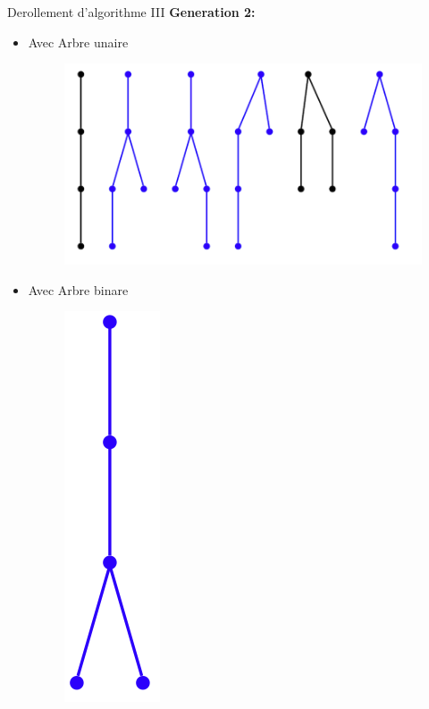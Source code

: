 \documentclass{beamer}
\begin{document}
\begin{frame}{Derollement d'algorithme III}
\textbf{Generation 2:}\\
\begin{itemize}
\item  Avec Arbre unaire
\begin{figure}[h]
  \centering
  \includegraphics[scale=0.17]{gen2-1.png}
\end{figure}
\item Avec Arbre binare
\begin{figure}[h]
  \centering
  \includegraphics[scale=0.17]{gen2-2.png}
\end{figure}
\end{itemize}
\end{frame}
\end{document}
